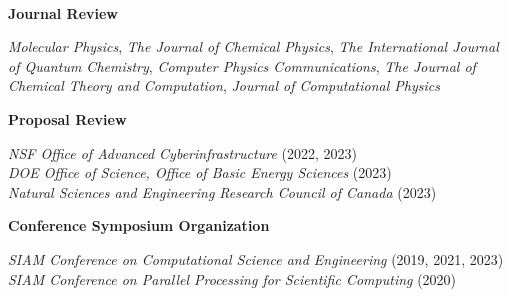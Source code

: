 \documentclass[10pt]{res} %
\begin{document}
\begin{resume}
~\\
\centerline{\bf Journal Review}
\vspace{-20pt}
\begin{center}
  \emph{Molecular Physics}, 
  \emph{The Journal of Chemical Physics}, 
  \emph{The International Journal of Quantum Chemistry}, 
  \emph{Computer Physics Communications},
  \emph{The Journal of Chemical Theory and Computation},
  \emph{Journal of Computational Physics}
\end{center}

\centerline{\bf Proposal Review}
\vspace{-15pt}
\begin{center}
\emph{NSF Office of Advanced Cyberinfrastructure} \hfill (2022, 2023) \\
\emph{DOE Office of Science, Office of Basic Energy Sciences} \hfill (2023) \\
\emph{Natural Sciences and Engineering Research Council of Canada} \hfill (2023)
\end{center}

\centerline{\bf Conference Symposium Organization}
\vspace{-15pt}
\begin{center}
\emph{SIAM Conference on Computational Science and Engineering}        \hfill (2019, 2021, 2023) \\
\emph{SIAM Conference on Parallel Processing for Scientific Computing} \hfill (2020)
\end{center}


\end{resume}
\end{document}
